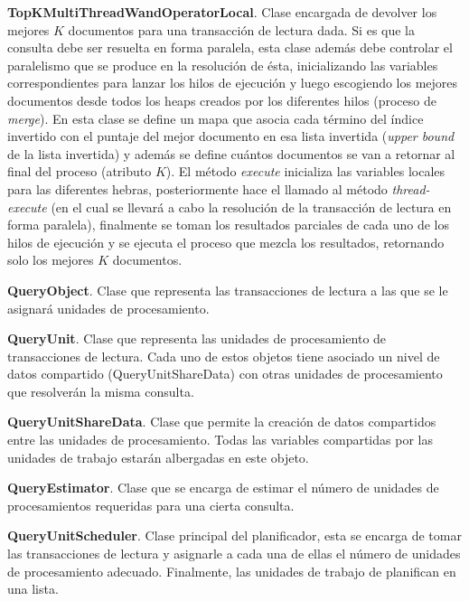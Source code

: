 \begin{list}{}{}
	\item \textbf{TopKMultiThreadWandOperatorLocal}. Clase encargada de devolver los mejores $K$ documentos para una transacción de lectura dada. Si es que la consulta debe ser resuelta en forma paralela, esta clase además debe controlar el paralelismo que se produce en la resolución de ésta, inicializando las variables correspondientes para lanzar los hilos de ejecución y luego escogiendo los mejores documentos desde todos los heaps creados por los diferentes hilos (proceso de \textit{merge}). En esta clase se define un mapa que asocia cada término del índice invertido con el puntaje del mejor documento en esa lista invertida (\textit{upper bound} de la lista invertida) y además se define cuántos documentos se van a retornar al final del proceso (atributo $K$). El método \textit{execute} inicializa las variables locales para las diferentes hebras, posteriormente hace el llamado al método \emph{thread-execute} (en el cual se llevará a cabo la resolución de la transacción de lectura en forma paralela), finalmente se toman los resultados parciales de cada uno de los hilos de ejecución y se ejecuta el proceso que mezcla los resultados, retornando solo los mejores $K$ documentos. 
	
	\item \textbf{QueryObject}. Clase que representa las transacciones de lectura a las que se le asignará unidades de procesamiento.
	
	\item \textbf{QueryUnit}. Clase que representa las unidades de procesamiento de transacciones de lectura. Cada uno de estos objetos tiene asociado un nivel de datos compartido (QueryUnitShareData) con otras unidades de procesamiento que resolverán la misma consulta.
			
	\item \textbf{QueryUnitShareData}. Clase que permite la creación de datos compartidos entre las unidades de procesamiento. Todas las variables compartidas por las unidades de trabajo estarán albergadas en este objeto. 
	
	\item \textbf{QueryEstimator}. Clase que se encarga de estimar el número de unidades de procesamientos requeridas para una cierta consulta.
	 
	\item \textbf{QueryUnitScheduler}. Clase principal del planificador, esta se encarga de tomar las transacciones de lectura y asignarle a cada una de ellas el número de unidades de procesamiento adecuado. Finalmente, las unidades de trabajo de planifican en una lista.
\end{list}


